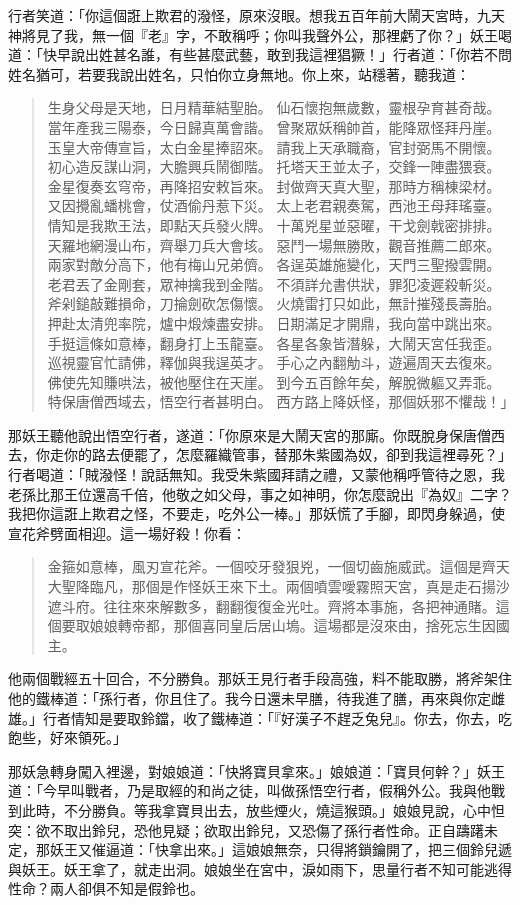 行者笑道：「你這個誑上欺君的潑怪，原來沒眼。想我五百年前大鬧天宮時，九天神將見了我，無一個『老』字，不敢稱呼；你叫我聲外公，那裡虧了你？」妖王喝道：「快早說出姓甚名誰，有些甚麼武藝，敢到我這裡猖獗！」行者道：「你若不問姓名猶可，若要我說出姓名，只怕你立身無地。你上來，站穩著，聽我道：
\begin{quote}
生身父母是天地，日月精華結聖胎。
仙石懷抱無歲數，靈根孕育甚奇哉。
當年產我三陽泰，今日歸真萬會諧。
曾聚眾妖稱帥首，能降眾怪拜丹崖。
玉皇大帝傳宣旨，太白金星捧詔來。
請我上天承職裔，官封弼馬不開懷。
初心造反謀山洞，大膽興兵鬧御階。
托塔天王並太子，交鋒一陣盡猥衰。
金星復奏玄穹帝，再降招安敕旨來。
封做齊天真大聖，那時方稱棟梁材。
又因攪亂蟠桃會，仗酒偷丹惹下災。
太上老君親奏駕，西池王母拜瑤臺。
情知是我欺王法，即點天兵發火牌。
十萬兇星並惡曜，干戈劍戟密排排。
天羅地網漫山布，齊舉刀兵大會垓。
惡鬥一場無勝敗，觀音推薦二郎來。
兩家對敵分高下，他有梅山兄弟儕。
各逞英雄施變化，天門三聖撥雲開。
老君丟了金剛套，眾神擒我到金階。
不須詳允書供狀，罪犯凌遲殺斬災。
斧剁鎚敲難損命，刀掄劍砍怎傷懷。
火燒雷打只如此，無計摧殘長壽胎。
押赴太清兜率院，爐中煅煉盡安排。
日期滿足才開鼎，我向當中跳出來。
手挺這條如意棒，翻身打上玉龍臺。
各星各象皆潛躲，大鬧天宮任我歪。
巡視靈官忙請佛，釋伽與我逞英才。
手心之內翻觔斗，遊遍周天去復來。
佛使先知賺哄法，被他壓住在天崖。
到今五百餘年矣，解脫微軀又弄乖。
特保唐僧西域去，悟空行者甚明白。
西方路上降妖怪，那個妖邪不懼哉！」
\end{quote}

那妖王聽他說出悟空行者，遂道：「你原來是大鬧天宮的那廝。你既脫身保唐僧西去，你走你的路去便罷了，怎麼羅織管事，替那朱紫國為奴，卻到我這裡尋死？」行者喝道：「賊潑怪！說話無知。我受朱紫國拜請之禮，又蒙他稱呼管待之恩，我老孫比那王位還高千倍，他敬之如父母，事之如神明，你怎麼說出『為奴』二字？我把你這誑上欺君之怪，不要走，吃外公一棒。」那妖慌了手腳，即閃身躲過，使宣花斧劈面相迎。這一場好殺！你看：
\begin{quote}
金箍如意棒，風刃宣花斧。一個咬牙發狠兇，一個切齒施威武。這個是齊天大聖降臨凡，那個是作怪妖王來下土。兩個噴雲噯霧照天宮，真是走石揚沙遮斗府。往往來來解數多，翻翻復復金光吐。齊將本事施，各把神通賭。這個要取娘娘轉帝都，那個喜同皇后居山塢。這場都是沒來由，捨死忘生因國主。
\end{quote}

他兩個戰經五十回合，不分勝負。那妖王見行者手段高強，料不能取勝，將斧架住他的鐵棒道：「孫行者，你且住了。我今日還未早膳，待我進了膳，再來與你定雌雄。」行者情知是要取鈴鐺，收了鐵棒道：「『好漢子不趕乏兔兒』。你去，你去，吃飽些，好來領死。」

那妖急轉身闖入裡邊，對娘娘道：「快將寶貝拿來。」娘娘道：「寶貝何幹？」妖王道：「今早叫戰者，乃是取經的和尚之徒，叫做孫悟空行者，假稱外公。我與他戰到此時，不分勝負。等我拿寶貝出去，放些煙火，燒這猴頭。」娘娘見說，心中怛突：欲不取出鈴兒，恐他見疑；欲取出鈴兒，又恐傷了孫行者性命。正自躊躇未定，那妖王又催逼道：「快拿出來。」這娘娘無奈，只得將鎖鑰開了，把三個鈴兒遞與妖王。妖王拿了，就走出洞。娘娘坐在宮中，淚如雨下，思量行者不知可能逃得性命？兩人卻俱不知是假鈴也。

